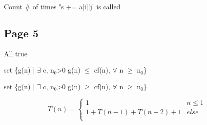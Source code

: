 \documentclass[12pt]{article}
\begin{document}
Count \# of times "s += a[i][j] is called

\subsection{Page 5}
\label{sec-10-4}

All true

set \{g(n) | $\exists$ c, n$_{\text{0}}$>0 g(n) $\le$ cf(n), $\forall$ n $\ge$ n$_{\text{0}}$\}

set \{g(n) | $\exists$ c, n$_{\text{0}}$>0 g(n) $\ge$ cf(n), $\forall$ n $\ge$ n$_{\text{0}}$\}

\[ T(n) = 
\begin{cases}
  1 & n \leq 1 \\
  1 + T(n-1) + T(n-2) + 1 & else \\
\end{cases}
\]
\end{document}
